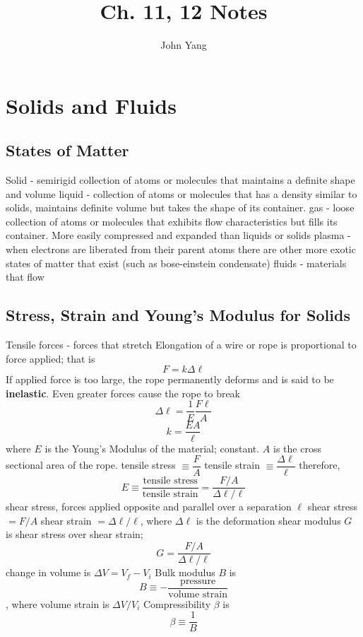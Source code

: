 \documentclass[twocolumn]{article}
\title{Ch. 11, 12 Notes}
\author{John Yang}
\begin{document}
\maketitle
\section{Solids and Fluids}
\subsection{States of Matter}
\begin{outline}
    \1 Solid - semirigid collection of atoms or molecules that maintains a definite shape and volume
    \1 liquid - collection of atoms or molecules that has a density similar to solids, maintains definite volume but takes the shape of its container. 
    \1 gas - loose collection of atoms or molecules that exhibits flow characteristics but fills its container. More easily compressed and expanded than liquids or solids
    \1 plasma - when electrons are liberated from their parent atoms
    \1 there are other more exotic states of matter that exist (such as bose-einstein condensate)
    \1 fluids - materials that flow
\end{outline}
\subsection{Stress, Strain and Young's Modulus for Solids}
\begin{outline}
    \1 Tensile forces - forces that stretch
        \2 Elongation of a wire or rope is proportional to force applied; that is \[F=k\Delta \ell\]
    \1 If applied force is too large, the rope permanently deforms and is said to be \textbf{inelastic}. Even greater forces cause the rope to break
\0 \[\Delta \ell = \dfrac{1}{E} \dfrac{F\ell}{A}\] \[k=\dfrac{EA}{\ell}\]
    \1 where $E$ is the Young's Modulus of the material; constant. $A$ is the cross sectional area of the rope.
    \1 tensile stress $\equiv \dfrac{F}{A}$
    \1 tensile strain $\equiv\dfrac{\Delta \ell}{\ell}$
    \1 therefore, \[E\equiv\dfrac{\text{tensile stress}}{\text{tensile strain}}=\dfrac{F/A}{\Delta \ell/\ell}\]
    \1 shear stress, forces applied opposite and parallel over a separation $\ell$
    \1 shear stress $= F/A$
    \1 shear strain $=\Delta \ell/\ell$, where $\Delta \ell$ is the deformation
    \1 shear modulus $G$ is shear stress over shear strain;
    \[G=\dfrac{F/A}{\Delta \ell/\ell}\]
    \1 change in volume is $\Delta V = V_f-V_i$
    \1 Bulk modulus $B$ is \[B\equiv-\dfrac{\text{pressure}}{\text{volume strain}}\], where volume strain is $\Delta V/V_i$
    \1 Compressibility $\beta$ is \[\beta\equiv\dfrac{1}{B}\]
\end{outline}
\end{document}
